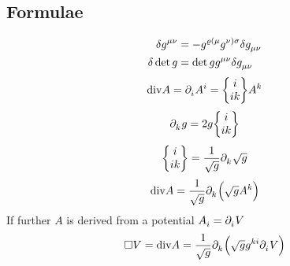 \begin{appendix}
\chapter{Formulae}
\begin{align}
\delta\tensor{g}{^\mu^\nu}
&=-\tensor{g}{^\varrho^{(\mu}}\tensor{g}{^{\nu)}^\sigma}\delta\tensor{g}{_\mu_\nu}\label{eq:grels}\\
\delta\det g&=\det g \tensor{g}{^\mu^\nu}\delta
\tensor{g}{_\mu_\nu}
\end{align}
\begin{equation}
\mathrm{div} A=\tensor{\partial}{_i}\tensor{A}{^i}=\cSym{i}{i}{k}\tensor{A}{^k}
\end{equation}
\begin{equation}
\tensor{\partial}{_k}g=2g\cSym{i}{i}{k}
\end{equation}
\begin{equation}
\cSym{i}{i}{k}=\frac{1}{\sqrt{g}}\tensor{\partial}{_k}\sqrt{g}
\end{equation}
\begin{equation}
\mathrm{div}
A=\frac{1}{\sqrt{g}}\tensor{\partial}{_k}\left(\sqrt{g}\tensor{A}{^k}\right)
\end{equation}
If further $A$ is derived from a potential
$\tensor{A}{_i}=\tensor{\partial}{_i}V$
\begin{equation}
\square V
=\mathrm{div}A
=\frac{1}{\sqrt{g}}\tensor{\partial}{_k}\left(\sqrt{g}\tensor{g}{^k^i}\tensor{\partial}{_i}V\right)\label{eq:quabla}
\end{equation}
\end{appendix}